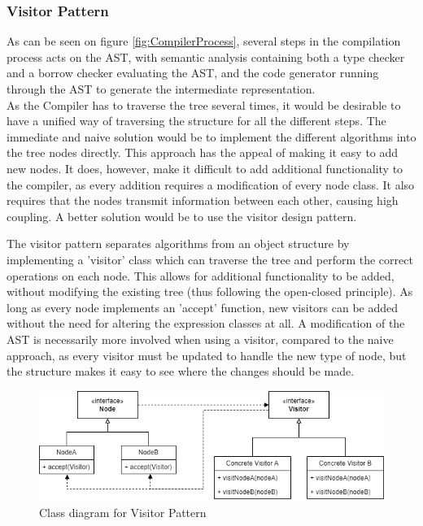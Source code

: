\subsubsection{Visitor Pattern}
\label{sec:VisitorDesign}

As can be seen on figure \ref{fig:CompilerProcess}, several steps in the compilation process acts on the AST, with semantic analysis containing both a type checker and a borrow checker evaluating the AST, and the code generator running through the AST to generate the intermediate representation.\\
As the Compiler has to traverse the tree several times, it would be desirable to have a unified way of traversing the structure for all the different steps. The immediate and naive solution would be to implement the different algorithms into the tree nodes directly. This approach has the appeal of making it easy to add new nodes. It does, however, make it difficult to add additional functionality to the compiler, as every addition requires a modification of every node class. It also requires that the nodes transmit information between each other, causing high coupling. A better solution would be to use the visitor design pattern.

The visitor pattern separates algorithms from an object structure by implementing a 'visitor' class which can traverse the tree and perform the correct operations on each node. This allows for additional functionality to be added, without modifying the existing tree (thus following the open-closed principle). As long as every node implements an 'accept' function, new visitors can be added without the need for altering the expression classes at all. A modification of the AST is necessarily more involved when using a visitor, compared to the naive approach, as every visitor must be updated to handle the new type of node, but the structure makes it easy to see where the changes should be made. 

\begin{figure}[h]
\includegraphics[width=\textwidth]{02-Body/Images/VisitorClassDiag.png}
\caption{Class diagram for Visitor Pattern}
\label{fig:VisitorClassDiagram}
\end{figure}

